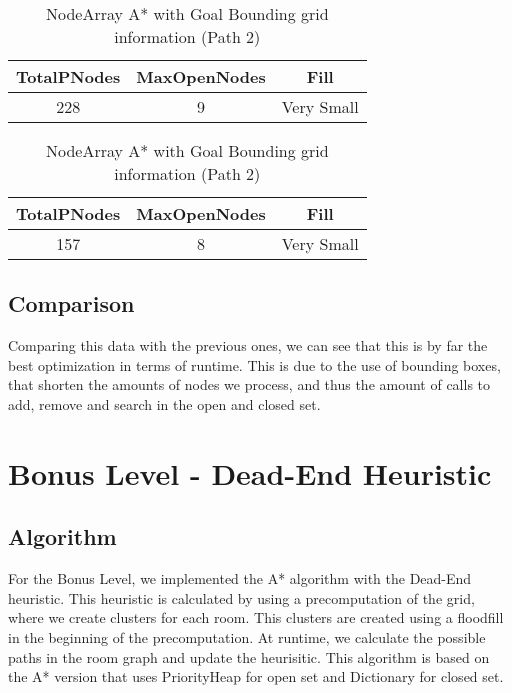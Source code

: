 \documentclass{article}
\begin{document}
  \begin{table}[h!]
    \parbox{.45\linewidth}{
        \centering
        \caption{NodeArray A* with Goal Bounding grid information (Path 1)}
        \label{tab:tableGoalBoundingGrid1}
        \begin{tabular}{c|c|c}
          \textbf{TotalPNodes} & \textbf{MaxOpenNodes} & \textbf{Fill}\\
          \hline
          228 & 9 & Very Small\\
        \end{tabular}
    }
    \hfil
    \parbox{.45\linewidth}{
        \centering
        \caption{NodeArray A* with Goal Bounding grid information (Path 2)}
        \label{tab:tableGoalBoundingGrid2}
        \begin{tabular}{c|c|c}
          \textbf{TotalPNodes} & \textbf{MaxOpenNodes} & \textbf{Fill}\\
          \hline
          157 & 8 & Very Small\\
        \end{tabular}
    }
  \end{table}

  \subsection{Comparison}
  Comparing this data with the previous ones, we can see that this is by far the best optimization in terms of runtime. This is due to the use of bounding boxes,
  that shorten the amounts of nodes we process, and thus the amount of calls to add, remove and search in the open and closed set.\\

  \section{Bonus Level - Dead-End Heuristic}

  \subsection{Algorithm}
  For the Bonus Level, we implemented the A* algorithm with the Dead-End heuristic. This heuristic is calculated by using a precomputation of the grid, where we
  create clusters for each room. This clusters are created using a floodfill in the beginning of the precomputation. At runtime, we calculate the possible paths 
  in the room graph and update the heurisitic. This algorithm is based on the A* version that uses PriorityHeap for open set and Dictionary for closed set.\\
  
\end{document}
